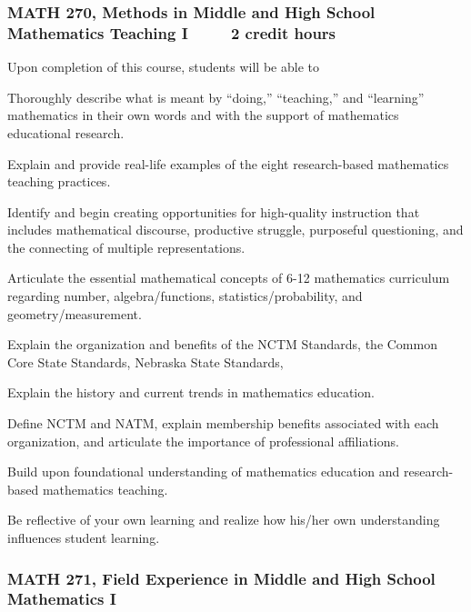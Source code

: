 \subsubsection*{MATH 270, Methods in Middle and High School Mathematics Teaching I     2 credit hours}

Upon completion of this course, students will be able to
\begin{alphalist}

\item Thoroughly describe what is meant by “doing,”  “teaching,”  and “learning” mathematics in their own words and with the support of mathematics educational research.
\item Explain and provide real-life examples of the eight research-based mathematics teaching practices.
\item Identify and begin creating opportunities for high-quality instruction that includes mathematical discourse, productive struggle, purposeful questioning, and the connecting of multiple representations. 
\item Articulate the essential mathematical concepts of 6-12 mathematics curriculum regarding number, algebra/functions, statistics/probability, and geometry/measurement.
\item Explain the organization and benefits of the NCTM Standards, the Common Core State Standards, Nebraska State Standards, 
\item Explain the history and current trends in mathematics education.
\item Define NCTM and NATM, explain membership benefits associated with each organization, and articulate the importance of professional affiliations.
\item Build upon foundational understanding of mathematics education and research-based mathematics teaching.
\item Be reflective of your own learning and realize how his/her own understanding influences student learning.
\end{alphalist}

\subsubsection*{MATH 271, Field Experience in Middle and High School Mathematics I}

